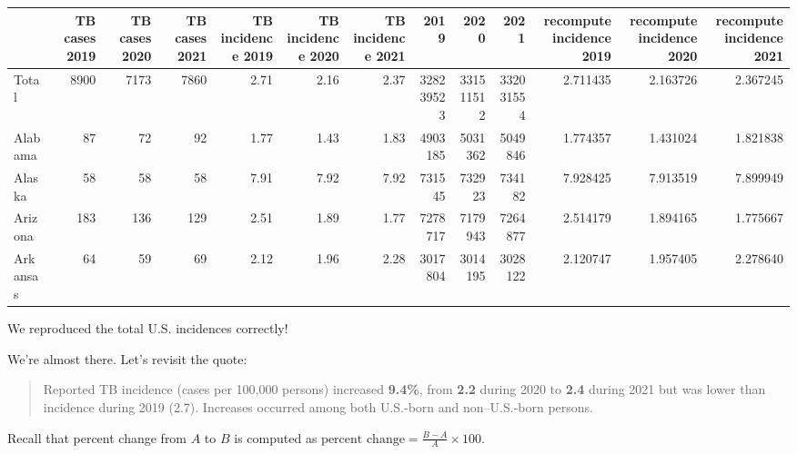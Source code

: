 \documentclass[
  letterpaper,
  DIV=11,
  numbers=noendperiod]{scrreprt}
\begin{document}
\begin{tabular}{lrrrrrrrrrrrr}
\toprule
{} &  TB cases 2019 &  TB cases 2020 &  TB cases 2021 &  TB incidence 2019 &  TB incidence 2020 &  TB incidence 2021 &       2019 &       2020 &       2021 &  recompute incidence 2019 &  recompute incidence 2020 &  recompute incidence 2021 \\
\midrule
Total    &           8900 &           7173 &           7860 &               2.71 &               2.16 &               2.37 &  328239523 &  331511512 &  332031554 &                  2.711435 &                  2.163726 &                  2.367245 \\
Alabama  &             87 &             72 &             92 &               1.77 &               1.43 &               1.83 &    4903185 &    5031362 &    5049846 &                  1.774357 &                  1.431024 &                  1.821838 \\
Alaska   &             58 &             58 &             58 &               7.91 &               7.92 &               7.92 &     731545 &     732923 &     734182 &                  7.928425 &                  7.913519 &                  7.899949 \\
Arizona  &            183 &            136 &            129 &               2.51 &               1.89 &               1.77 &    7278717 &    7179943 &    7264877 &                  2.514179 &                  1.894165 &                  1.775667 \\
Arkansas &             64 &             59 &             69 &               2.12 &               1.96 &               2.28 &    3017804 &    3014195 &    3028122 &                  2.120747 &                  1.957405 &                  2.278640 \\
\bottomrule
\end{tabular}

We reproduced the total U.S. incidences correctly!

We're almost there. Let's revisit the quote:

\begin{quote}
Reported TB incidence (cases per 100,000 persons) increased
\textbf{9.4\%}, from \textbf{2.2} during 2020 to \textbf{2.4} during
2021 but was lower than incidence during 2019 (2.7). Increases occurred
among both U.S.-born and non--U.S.-born persons.
\end{quote}

Recall that percent change from \(A\) to \(B\) is computed as
\(\text{percent change} = \frac{B - A}{A} \times 100\).
\end{document}
